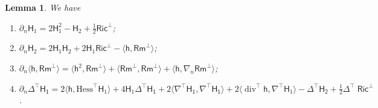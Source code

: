 \documentclass[11pt]{amsart}
\newcommand{\dvg}{\operatorname{div}}
\newcommand{\Ric}{\operatorname{Ric}}
\newtheorem{lemma}[theorem]{Lemma}
\theoremstyle{definition}
\numberwithin{equation}{section}
\begin{document}
\begin{lemma}\label{lem: partial n}
    We have
    \begin{enumerate}
        \item $\partial_n\mathsf H_1 = 2\mathsf H_1^2 - \mathsf H_2 + \frac{1}{2}\mathsf{Ric}^\bot$;
        \item $\partial_n\mathsf H_2 = 2\mathsf H_1\mathsf H_2 + 2\mathsf H_1\mathsf{Ric}^\bot - \langle \mathsf h, \mathsf{Rm}^\bot\rangle$;
        \item $\partial_n\langle\mathsf h, \mathsf{Rm}^\bot\rangle = \langle\mathsf h^2,\mathsf{Rm}^\bot\rangle + \langle\mathsf{Rm}^\bot,\mathsf{Rm}^\bot\rangle + \langle\mathsf h, \nabla_n\mathsf{Rm}^\bot\rangle$;
        \item $\partial_n\mathsf{\Delta^\top H_1} = 2\langle \mathsf h, \mathrm{Hess}^\top\mathsf H_1\rangle + 4\mathsf H_1\mathsf{\Delta^\top H_1} + 2\langle\mathsf{\nabla^\top H_1},\mathsf{\nabla^\top H_1}\rangle + 2\langle\dvg^\top\mathsf h, \nabla^\top\mathsf H_1\rangle - \mathsf{\Delta^\top H_2} + \frac{1}{2}\mathsf{\Delta^\top \Ric^\bot}$.
    \end{enumerate}
\end{lemma}
\end{document}
